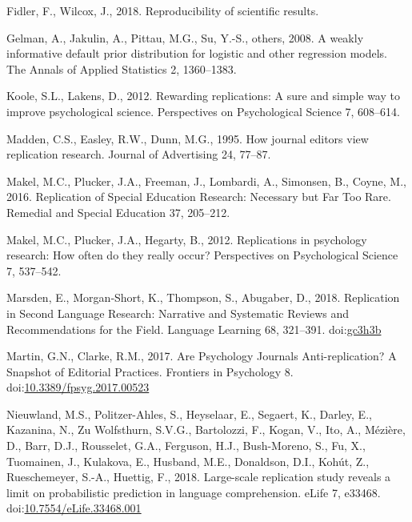 \documentclass[]{elsarticle} %
\newlength{\cslhangindent}
\newenvironment{CSLReferences}[2] %
 {%
  \setlength{\parindent}{0pt}
  \ifodd #1 \everypar{\setlength{\hangindent}{\cslhangindent}}\ignorespaces\fi
  \ifnum #2 > 0
  \setlength{\parskip}{#2\baselineskip}
  \fi
 }%
 {}
\begin{document}
\begin{CSLReferences}{1}{0}
\leavevmode{}%
Fidler, F., Wilcox, J., 2018. Reproducibility of scientific results.

\leavevmode{}%
Gelman, A., Jakulin, A., Pittau, M.G., Su, Y.-S., others, 2008. A weakly
informative default prior distribution for logistic and other regression
models. The Annals of Applied Statistics 2, 1360--1383.

\leavevmode{}%
Koole, S.L., Lakens, D., 2012. Rewarding replications: {A} sure and
simple way to improve psychological science. Perspectives on
Psychological Science 7, 608--614.

\leavevmode{}%
Madden, C.S., Easley, R.W., Dunn, M.G., 1995. How journal editors view
replication research. Journal of Advertising 24, 77--87.

\leavevmode{}%
Makel, M.C., Plucker, J.A., Freeman, J., Lombardi, A., Simonsen, B.,
Coyne, M., 2016. Replication of {Special} {Education} {Research}:
{Necessary} but {Far} {Too} {Rare}. Remedial and Special Education 37,
205--212.

\leavevmode{}%
Makel, M.C., Plucker, J.A., Hegarty, B., 2012. Replications in
psychology research: {How} often do they really occur? Perspectives on
Psychological Science 7, 537--542.

\leavevmode{}%
Marsden, E., Morgan‐Short, K., Thompson, S., Abugaber, D., 2018.
Replication in {Second} {Language} {Research}: {Narrative} and
{Systematic} {Reviews} and {Recommendations} for the {Field}. Language
Learning 68, 321--391. doi:\href{https://doi.org/gc3h3b}{gc3h3b}

\leavevmode{}%
Martin, G.N., Clarke, R.M., 2017. Are {Psychology} {Journals}
{Anti}-replication? {A} {Snapshot} of {Editorial} {Practices}. Frontiers
in Psychology 8.
doi:\href{https://doi.org/10.3389/fpsyg.2017.00523}{10.3389/fpsyg.2017.00523}

\leavevmode{}%
Nieuwland, M.S., Politzer-Ahles, S., Heyselaar, E., Segaert, K., Darley,
E., Kazanina, N., Zu Wolfsthurn, S.V.G., Bartolozzi, F., Kogan, V., Ito,
A., Mézière, D., Barr, D.J., Rousselet, G.A., Ferguson, H.J.,
Bush-Moreno, S., Fu, X., Tuomainen, J., Kulakova, E., Husband, M.E.,
Donaldson, D.I., Kohút, Z., Rueschemeyer, S.-A., Huettig, F., 2018.
Large-scale replication study reveals a limit on probabilistic
prediction in language comprehension. eLife 7, e33468.
doi:\href{https://doi.org/10.7554/eLife.33468.001}{10.7554/eLife.33468.001}


\end{CSLReferences}
\end{document}
